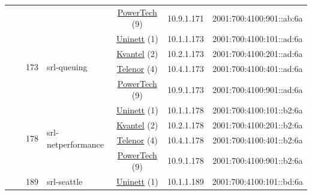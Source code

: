 \begin{small}
\begin{center}
\begin{longtable}{|c|c|c|c|c|c|c|c|}
  &  &  &  & \multicolumn{2}{|c|}{\tiny{\href{http://www.powertech.no}{PowerTech} (9)}} & \tiny{10.9.1.171} & \tiny{2001:700:4100:901::ab:6a} \\* \cline{3-3}\cline{4-4}\cline{5-5}\cline{6-6}\cline{7-7}\cline{8-8}
  &  & \multirow{4}{*}{\tiny{173}} & \multicolumn{1}{|l|}{\multirow{4}{*}{\tiny{srl-queuing}}} & \multicolumn{2}{|c|}{\tiny{\href{https://www.uninett.no}{Uninett} (1)}} & \tiny{10.1.1.173} & \tiny{2001:700:4100:101::ad:6a} \\* \cline{5-5}\cline{6-6}\cline{7-7}\cline{8-8}
  &  &  &  & \multicolumn{2}{|c|}{\tiny{\href{http://kvantel.no}{Kvantel} (2)}} & \tiny{10.2.1.173} & \tiny{2001:700:4100:201::ad:6a} \\* \cline{5-5}\cline{6-6}\cline{7-7}\cline{8-8}
  &  &  &  & \multicolumn{2}{|c|}{\tiny{\href{https://www.telenor.no}{Telenor} (4)}} & \tiny{10.4.1.173} & \tiny{2001:700:4100:401::ad:6a} \\* \cline{5-5}\cline{6-6}\cline{7-7}\cline{8-8}
  &  &  &  & \multicolumn{2}{|c|}{\tiny{\href{http://www.powertech.no}{PowerTech} (9)}} & \tiny{10.9.1.173} & \tiny{2001:700:4100:901::ad:6a} \\* \cline{3-3}\cline{4-4}\cline{5-5}\cline{6-6}\cline{7-7}\cline{8-8}
  &  & \multirow{4}{*}{\tiny{178}} & \multicolumn{1}{|l|}{\multirow{4}{*}{\tiny{srl-netperformance}}} & \multicolumn{2}{|c|}{\tiny{\href{https://www.uninett.no}{Uninett} (1)}} & \tiny{10.1.1.178} & \tiny{2001:700:4100:101::b2:6a} \\* \cline{5-5}\cline{6-6}\cline{7-7}\cline{8-8}
  &  &  &  & \multicolumn{2}{|c|}{\tiny{\href{http://kvantel.no}{Kvantel} (2)}} & \tiny{10.2.1.178} & \tiny{2001:700:4100:201::b2:6a} \\* \cline{5-5}\cline{6-6}\cline{7-7}\cline{8-8}
  &  &  &  & \multicolumn{2}{|c|}{\tiny{\href{https://www.telenor.no}{Telenor} (4)}} & \tiny{10.4.1.178} & \tiny{2001:700:4100:401::b2:6a} \\* \cline{5-5}\cline{6-6}\cline{7-7}\cline{8-8}
  &  &  &  & \multicolumn{2}{|c|}{\tiny{\href{http://www.powertech.no}{PowerTech} (9)}} & \tiny{10.9.1.178} & \tiny{2001:700:4100:901::b2:6a} \\* \cline{3-3}\cline{4-4}\cline{5-5}\cline{6-6}\cline{7-7}\cline{8-8}
  &  & \multirow{4}{*}{\tiny{189}} & \multicolumn{1}{|l|}{\multirow{4}{*}{\tiny{srl-seattle}}} & \multicolumn{2}{|c|}{\tiny{\href{https://www.uninett.no}{Uninett} (1)}} & \tiny{10.1.1.189} & \tiny{2001:700:4100:101::bd:6a} \\* \cline{5-5}\cline{6-6}\cline{7-7}\cline{8-8}

\end{longtable}
\end{center}
\end{small}

